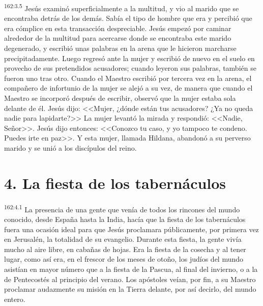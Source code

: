 \par 
\textsuperscript{162:3.5} Jesús examinó superficialmente a la multitud, y vio al marido que se encontraba detrás de los demás. Sabía el tipo de hombre que era y percibió que era cómplice en esta transacción despreciable. Jesús empezó por caminar alrededor de la multitud para acercarse donde se encontraba este marido degenerado, y escribió unas palabras en la arena que le hicieron marcharse precipitadamente. Luego regresó ante la mujer y escribió de nuevo en el suelo en provecho de sus pretendidos acusadores; cuando leyeron sus palabras, también se fueron uno tras otro. Cuando el Maestro escribió por tercera vez en la arena, el compañero de infortunio de la mujer se alejó a su vez, de manera que cuando el Maestro se incorporó después de escribir, observó que la mujer estaba sola delante de él. Jesús dijo: <<Mujer, ¿dónde están tus acusadores? ¿Ya no queda nadie para lapidarte?>> La mujer levantó la mirada y respondió: <<Nadie, Señor>>. Jesús dijo entonces: <<Conozco tu caso, y yo tampoco te condeno. Puedes irte en paz>>. Y esta mujer, llamada Hildana, abandonó a su perverso marido y se unió a los discípulos del reino.

\section*{4. La fiesta de los tabernáculos}
\par 
\textsuperscript{162:4.1} La presencia de una gente que venía de todos los rincones del mundo conocido, desde España hasta la India, hacía que la fiesta de los tabernáculos fuera una ocasión ideal para que Jesús proclamara públicamente, por primera vez en Jerusalén, la totalidad de su evangelio. Durante esta fiesta, la gente vivía mucho al aire libre, en cabañas de hojas. Era la fiesta de la cosecha y al tener lugar, como así era, en el frescor de los meses de otoño, los judíos del mundo asistían en mayor número que a la fiesta de la Pascua, al final del invierno, o a la de Pentecostés al principio del verano. Los apóstoles veían, por fin, a su Maestro proclamar audazmente su misión en la Tierra delante, por así decirlo, del mundo entero.

